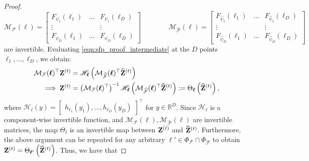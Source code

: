 \begin{proof}
    \begin{equation*}
        \mathcal{M}_{\mathcal{F}}(\mathbf{\boldsymbol \ell}) = \begin{bmatrix}
            F_{\psi_1}(\ell_1) & \ldots & F_{\psi_1}(\ell_D) \\
            \vdots & & \vdots\\
            F_{\psi_D}(\ell_1) & \ldots & F_{\psi_D}(\ell_D) 
        \end{bmatrix} \qquad \qquad \mathcal{M}_{\widehat{\mathcal{F}}}(\mathbf{\boldsymbol \ell}) = \begin{bmatrix}
            {F}_{\widehat{\psi}_1}(\ell_1) & \ldots & {F}_{\widehat{\psi}_1}(\ell_D) \\
            \vdots & & \vdots\\
            {F}_{\widehat{\psi}_D}(\ell_1) & \ldots & {F}_{\widehat{\psi}_D}(\ell_D)
        \end{bmatrix}
    \end{equation*}
    are invertible. Evaluating \eqref{eqn:sfp_proof_intermediate} at the $D$ points $\ell_1, \ldots, \ell_D$, we obtain:
    \begin{align}
        \mathcal{M}_{\mathcal{F}}(\mathbf{\boldsymbol \ell})^\top\mathbf{Z}^{(t)} &= \mathscr{H}_{\mathbf{\boldsymbol \ell}} \left(\mathcal{M}_{\widehat{\mathcal{F}}}(\mathbf{\boldsymbol \ell})^\top \widehat{\mathbf{Z}}^{(t)} \right) \nonumber \\
        \implies \mathbf{Z}^{(t)} &= \left(\mathcal{M}_{\mathcal{F}}(\mathbf{\boldsymbol \ell})^{\top}\right)^{-1}\mathscr{H}_{\mathbf{\boldsymbol \ell}} \left(\mathcal{M}_{\widehat{\mathcal{F}}}(\mathbf{\boldsymbol \ell})^\top \widehat{\mathbf{Z}}^{(t)} \right) := \Theta_\mathbf{\boldsymbol \ell} \left(\widehat{\mathbf{Z}}^{(t)}\right), \label{eqn:theta_def} 
    \end{align}
    where $\displaystyle \mathscr{H}_{\mathbf{\boldsymbol \ell}}(y) = \begin{bmatrix}
        h_{\ell_1}(y_1), \ldots, h_{\ell_D}(y_D)
    \end{bmatrix}^\top$ for $y \in \mathbb{R}^D$. Since $\mathscr{H}_\mathbf{\boldsymbol \ell}$ is a component-wise invertible function, and $\mathcal{M}_{\mathcal{F}}(\mathbf{\boldsymbol \ell}), \mathcal{M}_{\widehat{\mathcal{F}}}(\mathbf{\boldsymbol \ell})$ are invertible matrices, the map $\Theta_\mathbf{\boldsymbol \ell}$ is an invertible map between $\mathbf{Z}^{(t)}$ and $\widehat{\mathbf{Z}}^{(t)}$. Furthermore, the above argument can be repeated for any arbitrary $\mathbf{\boldsymbol \ell}' \in \Phi_\mathcal{F} \cap \Phi_{\widehat{\mathcal{F}}}$ to obtain $\mathbf{Z}^{(t)} = \Theta_{\mathbf{\boldsymbol \ell}'} \left(\widehat{\mathbf{Z}}^{(t)} \right)$. Thus, we have that 

\end{proof}
